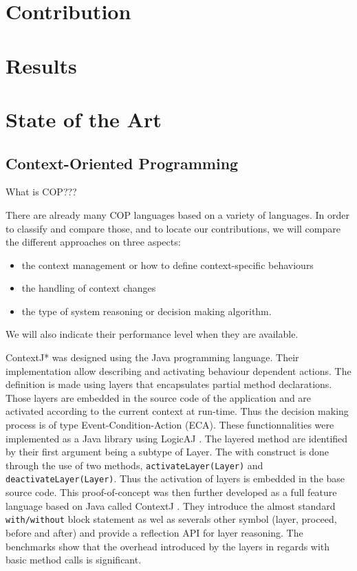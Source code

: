 \documentclass[a4paper]{article}
\begin{document}
\section{Contribution}

\section{Results}

\section{State of the Art}

\subsection{Context-Oriented Programming}

What is COP???

There are already many COP languages based on a variety of languages. In order to classify and compare those, and to locate our contributions, we will compare the different approaches on three aspects:
\begin{itemize}
  \item the context management or how to define context-specific behaviours
  \item the handling of context changes
  \item the type of system reasoning or decision making algorithm.
\end{itemize}

We will also indicate their performance level when they are available.

ContextJ* \cite{appeltauer_dedicated_2008} was designed using the Java programming language. Their implementation allow describing and activating behaviour dependent actions. The definition is made using layers that encapsulates partial method declarations. Those layers are embedded in the source code of the application and are activated according to the current context at run-time. Thus the decision making process is of type Event-Condition-Action (ECA). These functionnalities were implemented as a Java library using LogicAJ \cite{}. The layered method are identified by their first argument being a subtype of Layer. The  with construct is done through the use of two methods, \lstinline|activateLayer(Layer)| and \lstinline|deactivateLayer(Layer)|. Thus the activation of layers is embedded in the base source code. This proof-of-concept was then further developed as a full feature language based on Java called ContextJ \cite{haupt_contextj:_2011} \cite{appeltauer_improving_2009}. They introduce  the almost standard \lstinline|with/without| block statement as wel as severals other symbol (layer, proceed, before and after) and provide a reflection API for layer reasoning. The benchmarks show that the overhead introduced by the layers in regards with basic method calls is significant.
\end{document}
